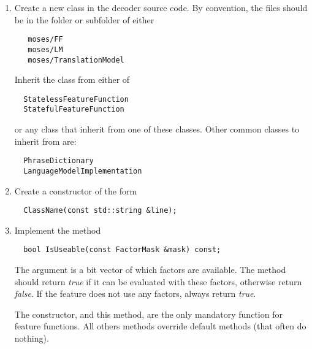 \documentclass{pbml}
\begin{document}
\begin{enumerate}
    \item Create a new class in the decoder source code. By convention, the files should be in the folder or subfolder of either
\begin{verbatim}
   moses/FF
   moses/LM
   moses/TranslationModel
\end{verbatim}
Inherit the class from either of
\begin{verbatim}
  StatelessFeatureFunction
  StatefulFeatureFunction
\end{verbatim}
or any class that inherit from one of these classes. Other common classes to inherit from are:
\begin{verbatim}
  PhraseDictionary
  LanguageModelImplementation
\end{verbatim}

    \item Create a constructor of the form
\begin{verbatim}
  ClassName(const std::string &line);
\end{verbatim}

    \item Implement the method
\begin{verbatim}
  bool IsUseable(const FactorMask &mask) const;
\end{verbatim}
The argument is a bit vector of which factors are available. The method should return \emph{true} if it can be evaluated with these factors, otherwise return \emph{false}. If the feature does not use any factors, always return  \emph{true}. 

The constructor, and this method, are the only mandatory function for feature functions. All others methods override default methods (that often do nothing).


\end{enumerate}
\end{document}

